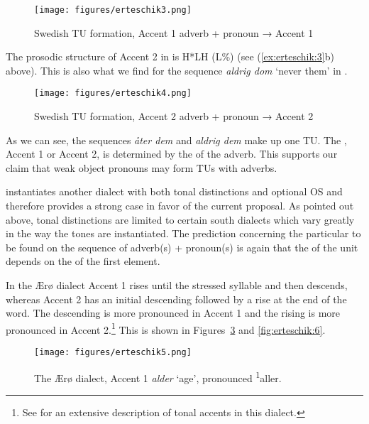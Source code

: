 \documentclass[output=paper]{LSP/langsci}
\begin{document}
\begin{figure}
\texttt{[image: figures/erteschik3.png]}
\caption{Swedish TU formation, Accent 1 adverb + pronoun → Accent 1}
\label{fig:erteschik:3}
\end{figure}

The prosodic structure of Accent 2 in  is H*LH (L\%) (see (\ref{ex:erteschik:3}b) above). This is also what we find for the sequence \textit{aldrig dom} ‘never them’ in .

\begin{figure}[H]
\texttt{[image: figures/erteschik4.png]}
\caption{Swedish TU formation, Accent 2 adverb + pronoun → Accent 2}
\label{fig:erteschik:4}
\end{figure}

As we can see, the sequences \textit{åter dem} and \textit{aldrig dem} make up one TU. The , Accent 1 or Accent 2, is determined by the  of the adverb. This supports our claim that weak object pronouns may form TUs with adverbs.

 instantiates another dialect with both tonal distinctions and optional OS and therefore provides a strong case in favor of the current proposal. As pointed out above, tonal distinctions are limited to certain south  dialects which vary greatly in the way the tones are instantiated. The prediction concerning the particular  to be found on the sequence of adverb(s) + pronoun(s) is again that the  of the unit depends on the  of the first element.

In the Ærø dialect Accent 1 rises until the stressed syllable and then descends, whereas Accent 2 has an initial descending  followed by a rise at the end of the word. The descending  is more pronounced in Accent 1 and the rising  is more pronounced in Accent 2.\footnote{See \citealt{Kroman1947} for an extensive description of tonal accents in this dialect.} This is shown in Figures~\ref{fig:erteschik:5} and \ref{fig:erteschik:6}.

  

 

\begin{figure}
\texttt{[image: figures/erteschik5.png]}
\caption{The Ærø dialect, Accent 1 \textit{alder} ‘age’, pronounced \textsuperscript{1}aller.}
\label{fig:erteschik:5}
\end{figure}
\end{document}
